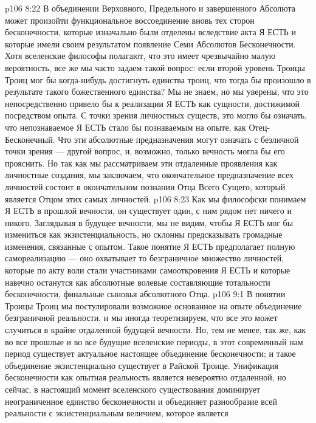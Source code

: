 \vs p106 8:22 В объединении Верховного, Предельного и завершенного Абсолюта может произойти функциональное воссоединение вновь тех сторон бесконечности, которые изначально были отделены вследствие акта Я ЕСТЬ и которые имели своим результатом появление Семи Абсолютов Бесконечности. Хотя вселенские философы полагают, что это имеет чрезвычайно малую вероятность, все же мы часто задаем такой вопрос: если второй уровень Троицы Троиц мог бы когда\hyp{}нибудь достигнуть единства троиц, что тогда бы произошло в результате такого божественного единства? Мы не знаем, но мы уверены, что это непосредственно привело бы к реализации Я ЕСТЬ как сущности, достижимой посредством опыта. С точки зрения личностных существ, это могло бы означать, что непознаваемое Я ЕСТЬ стало бы познаваемым на опыте, как Отец\hyp{}Бесконечный. Что эти абсолютные предназначения могут означать с безличной точки зрения --- другой вопрос, и, возможно, только вечность могла бы его прояснить. Но так как мы рассматриваем эти отдаленные проявления как личностные создания, мы заключаем, что окончательное предназначение всех личностей состоит в окончательном познании Отца Всего Сущего, который является Отцом этих самых личностей.
\vs p106 8:23 Как мы философски понимаем Я ЕСТЬ в прошлой вечности, он существует один, с ним рядом нет ничего и никого. Заглядывая в будущее вечности, мы не видим, чтобы Я ЕСТЬ мог бы измениться как экзистенциальность, но склонны предсказывать громадные изменения, связанные с опытом. Такое понятие Я ЕСТЬ предполагает полную самореализацию --- оно охватывает то безграничное множество личностей, которые по акту воли стали участниками самооткровения Я ЕСТЬ и которые навечно останутся как абсолютные волевые составляющие тотальности бесконечности, финальные сыновья абсолютного Отца.
\vs p106 9:1 В понятии Троицы Троиц мы постулировали возможное основанное на опыте объединение безграничной реальности, и мы иногда теоретизируем, что все это может случиться в крайне отдаленной будущей вечности. Но, тем не менее, так же, как во все прошлые и во все будущие вселенские периоды, в этот современный нам период существует актуальное настоящее объединение бесконечности; и такое объединение экзистенциально существует в Райской Троице. Унификация бесконечности как опытная реальность является невероятно отдаленной, но сейчас, в настоящий момент вселенского существования доминирует неограниченное единство бесконечности и объединяет разнообразие всей реальности с экзистенциальным величием, которое является 
